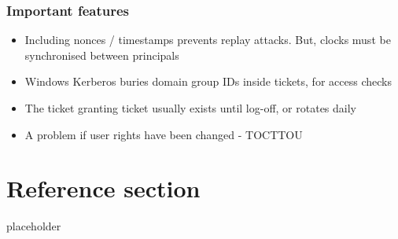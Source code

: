\documentclass{article}
\begin{document}
\subsubsection{Important features}
\begin{itemize}
  \item Including nonces / timestamps prevents replay attacks. But, clocks must be synchronised between principals 
  \item Windows Kerberos buries domain group IDs inside tickets, for access checks 
  \item The ticket granting ticket usually exists until log-off, or rotates daily 
  \item A problem if user rights have been changed - TOCTTOU
\end{itemize}

\pagebreak
\section*{Reference section} \label{sec:reference}
\begin{description}
	\item[placeholder] \hfill \\
\end{description}
\end{document}
